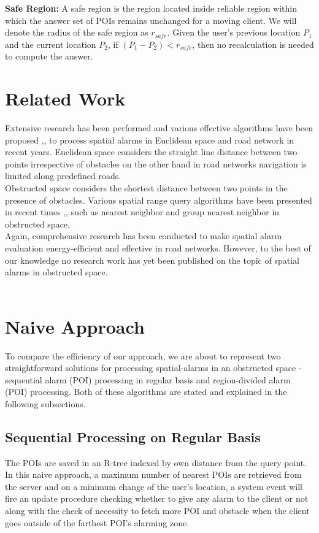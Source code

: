 \documentclass{sig-alternate}
\begin{document}
\begin{defn}
\textbf{Safe Region:} A safe region is the region located inside reliable region within which the answer set of POIs remains unchanged for a moving client. We will denote the radius of the safe region as $r_{safe}$. Given the user's previous location $P_1$ and the current location $P_2$, if $(P_1 - P_2) < r_{safe}$, then no recalculation is needed to compute the answer.
\end{defn}

\section{Related Work}
Extensive research has been performed and various  effective algorithms have been proposed \cite{roadalarm},\cite{mur},\cite{bamba} to process spatial alarms in Euclidean space and road network in recent years. Euclidean space considers the straight line distance between two points irrespective of obstacles on the other hand in road networks navigation is limited along predefined roads.\\ Obstructed space considers the shortest distance between two points in the presence of obstacles. Various spatial range query algorithms have been presented in recent times \cite{obst1},\cite{obst2},\cite{ognn} such as nearest neighbor and group nearest neighbor in obstructed space.\\
Again, comprehensive research \cite{liu} has been conducted to make spatial alarm evaluation energy-efficient and effective in road networks. 
However, to the best of our knowledge no research work has yet been published on the topic of spatial alarms in obstructed space.
\\
\\


\section{Naive Approach}
To compare the efficiency of our approach, we are about to represent two straightforward solutions for processing spatial-alarms in an obstructed space - sequential alarm (POI) processing in regular basis and region-divided alarm (POI) processing. 
Both of these algorithms are stated and explained in the following subsections.


\subsection{Sequential Processing on Regular Basis}
The POIs are saved in an R-tree indexed by own distance from the query point. In this naive approach, a maximum number of nearest POIs are retrieved from the server and on a minimum change of the user's location, a system event will fire an update procedure checking whether to give any alarm to the client or not along with the check of necessity to fetch more POI and obstacle when the client goes outside of the farthest POI's alarming zone.
\end{document}
